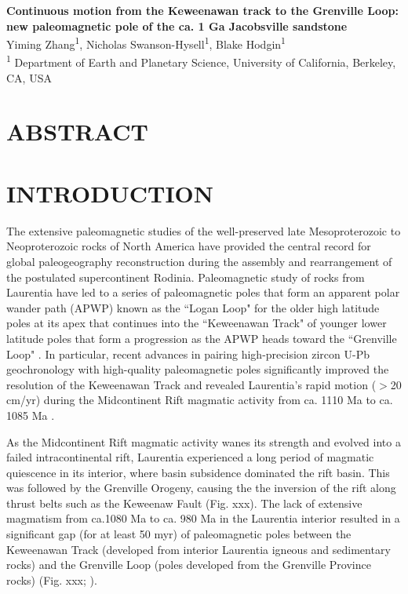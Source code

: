 \documentclass[11pt,letterpaper]{article}
\begin{document}
\begin{flushleft}

{\Large \textbf{Continuous motion from the Keweenawan track to the Grenville Loop: new paleomagnetic pole of the ca. 1 Ga Jacobsville sandstone}}
\\
\singlespacing
 Yiming Zhang\textsuperscript{1}, Nicholas Swanson-Hysell\textsuperscript{1}, Blake Hodgin\textsuperscript{1}\\
\bigskip
\textsuperscript{1} Department of Earth and Planetary Science, University of California, Berkeley, CA, USA\\

\smallskip
\end{flushleft}


\section*{ABSTRACT}


\section*{INTRODUCTION}

The extensive paleomagnetic studies of the well-preserved late Mesoproterozoic to Neoproterozoic rocks of North America have provided the central record for global paleogeography reconstruction during the assembly and rearrangement of the postulated supercontinent Rodinia. Paleomagnetic study of rocks from Laurentia have led to a series of paleomagnetic poles that form an apparent polar wander path (APWP) known as the ``Logan Loop" for the older high latitude poles at its apex that continues into the ``Keweenawan Track" of younger lower latitude poles that form a progression as the APWP heads toward the ``Grenville Loop" \citep{Swanson-Hysell2019a}. In particular, recent advances in pairing high-precision zircon U-Pb geochronology with high-quality paleomagnetic poles significantly improved the resolution of the Keweenawan Track and revealed Laurentia's rapid motion ($>$20 cm/yr) during the Midcontinent Rift magmatic activity from ca. 1110 Ma to ca. 1085 Ma \citep{Swanson-Hysell2019a}. 

As the Midcontinent Rift magmatic activity wanes its strength and evolved into a failed intracontinental rift, Laurentia experienced a long period of magmatic quiescence in its interior, where basin subsidence dominated the rift basin. This was followed by the Grenville Orogeny, causing the the inversion of the rift along thrust belts such as the Keweenaw Fault (Fig. xxx). The lack of extensive magmatism from ca.1080 Ma to ca. 980 Ma in the Laurentia interior resulted in a significant gap (for at least 50 myr) of paleomagnetic poles between the Keweenawan Track (developed from interior Laurentia igneous and sedimentary rocks) and the Grenville Loop (poles developed from the Grenville Province rocks) (Fig. xxx; \cite{Swanson-Hysell2019a}).  
\end{document}
